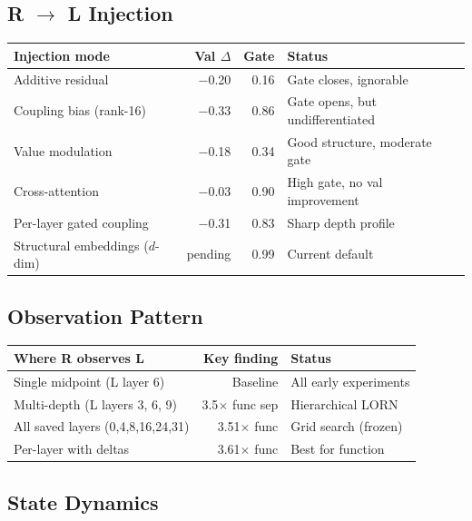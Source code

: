 \documentclass[11pt, a4paper]{article}
\theoremstyle{plain}
\theoremstyle{definition}
\theoremstyle{remark}
\begin{document}
\subsection{R $\to$ L Injection}

\begin{center}\small
\begin{tabular}{lrrl}
\toprule
\textbf{Injection mode} & \textbf{Val $\Delta$} & \textbf{Gate} & \textbf{Status} \\
\midrule
Additive residual & $-$0.20 & 0.16 & Gate closes, ignorable \\
Coupling bias (rank-16) & $-$0.33 & 0.86 & Gate opens, but undifferentiated \\
Value modulation & $-$0.18 & 0.34 & Good structure, moderate gate \\
Cross-attention & $-$0.03 & 0.90 & High gate, no val improvement \\
Per-layer gated coupling & $-$0.31 & 0.83 & Sharp depth profile \\
Structural embeddings ($d$-dim) & pending & 0.99 & Current default \\
\bottomrule
\end{tabular}
\end{center}

\subsection{Observation Pattern}

\begin{center}\small
\begin{tabular}{lrl}
\toprule
\textbf{Where R observes L} & \textbf{Key finding} & \textbf{Status} \\
\midrule
Single midpoint (L layer 6) & Baseline & All early experiments \\
Multi-depth (L layers 3, 6, 9) & 3.5$\times$ func sep & Hierarchical LORN \\
All saved layers (0,4,8,16,24,31) & 3.51$\times$ func & Grid search (frozen) \\
Per-layer with deltas & 3.61$\times$ func & Best for function \\
\bottomrule
\end{tabular}
\end{center}

\subsection{State Dynamics}
\end{document}

